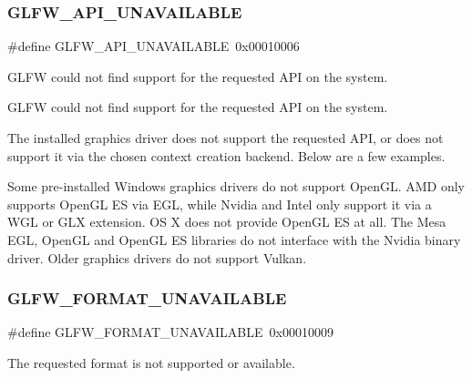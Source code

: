 \subsubsection{\texorpdfstring{G\+L\+F\+W\+\_\+\+A\+P\+I\+\_\+\+U\+N\+A\+V\+A\+I\+L\+A\+B\+LE}{GLFW\_API\_UNAVAILABLE}\hspace{0.1cm}{\footnotesize\ttfamily [5/5]}}
{\footnotesize\ttfamily \#define G\+L\+F\+W\+\_\+\+A\+P\+I\+\_\+\+U\+N\+A\+V\+A\+I\+L\+A\+B\+LE~0x00010006}



G\+L\+FW could not find support for the requested A\+PI on the system. 

G\+L\+FW could not find support for the requested A\+PI on the system.

The installed graphics driver does not support the requested A\+PI, or does not support it via the chosen context creation backend. Below are a few examples.

\begin{DoxyParagraph}{}
Some pre-\/installed Windows graphics drivers do not support Open\+GL. A\+MD only supports Open\+GL ES via E\+GL, while Nvidia and Intel only support it via a W\+GL or G\+LX extension. OS X does not provide Open\+GL ES at all. The Mesa E\+GL, Open\+GL and Open\+GL ES libraries do not interface with the Nvidia binary driver. Older graphics drivers do not support Vulkan. 
\end{DoxyParagraph}
\mbox{\label{group__errors_ga196e125ef261d94184e2b55c05762f14}} 
\subsubsection{\texorpdfstring{G\+L\+F\+W\+\_\+\+F\+O\+R\+M\+A\+T\+\_\+\+U\+N\+A\+V\+A\+I\+L\+A\+B\+LE}{GLFW\_FORMAT\_UNAVAILABLE}\hspace{0.1cm}{\footnotesize\ttfamily [1/5]}}
{\footnotesize\ttfamily \#define G\+L\+F\+W\+\_\+\+F\+O\+R\+M\+A\+T\+\_\+\+U\+N\+A\+V\+A\+I\+L\+A\+B\+LE~0x00010009}



The requested format is not supported or available. 

